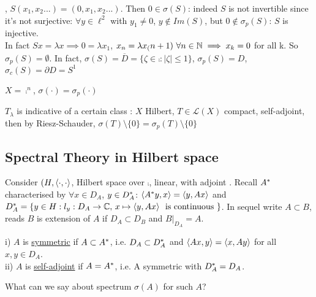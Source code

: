 \begin{example}\nl
	, $S(x_1,x_2...)=(0,x_1,x_2...)$. Then $0\in\sigma(S)$: indeed $S$ is not invertible since it's not surjective: $\forall y\in\ell^2$ with $y_1\neq0$, $ y\notin Im(S)$, but $0\notin\sigma_p(S)$: $S$ is injective.\\
	In fact $Sx=\lambda x\implies0=\lambda x_1$, $x_n=\lambda x_(n+1)\,\,\forall n\in\mathbb{N}\implies x_k=0$ for all k. So $\sigma_p(S)=\emptyset$. In fact, $\sigma(S)=\overline{D}=\{\zeta\in\comp:|\zeta|\leq1\}$, $\sigma_p(S)=D$, $\sigma_c(S)=\partial D=S^1$
\end{example}
\begin{example}\nl
	$X=\comp^n$, $\sigma(\cdot)=\sigma_p(\cdot)$
\end{example}
\begin{example}\nl
$T_\lambda$ is indicative of a certain class : $ X$ Hilbert, $T\in\mathcal{L}(X)$ compact, self-adjoint, then by Riesz-Schauder, $\sigma(T)\setminus\{0\}=\sigma_p(T)\setminus\{0\}
$
\end {example}


\subsection{Spectral Theory in Hilbert space}
Consider $(H,\left<{\cdot},{\cdot}\right>$, Hilbert space over $\comp$,  linear, with adjoint . Recall ${A}^*$ characterised by $\forall x\in D_A$, $y\in D_{A}^*$: $\left<{{A}^*y},{x}\right>=\left<{y},{Ax}\right>$ and $D_{A}^*=\{y\in H : l_y:D_A\to \mathbb{C},\,x\mapsto \left<{y},{Ax}\right>\,\text{ is continuous }\}$.
In sequel write $A\subset B$, reads $B$ is extension of $A$ if $D_A\subset D_B$ and $B|_{D_A}=A$.


\begin{definition}\nl
	i)  $A$ is {\underline{symmetric}} if $A\subset {A}^*$, i.e. $D_A\subset D_{A}^*$ and $\left<{Ax},{y}\right>=\left<{x},{Ay}\right>$ for all $x,y\in D_A$.\\
	ii) $A$ is {\underline{self-adjoint}} if $A={A}^*$, i.e. A symmetric with $D_{A}^*=D_A$.
\end{definition}

What can we say about spectrum $\sigma(A)$ for such $A$?

